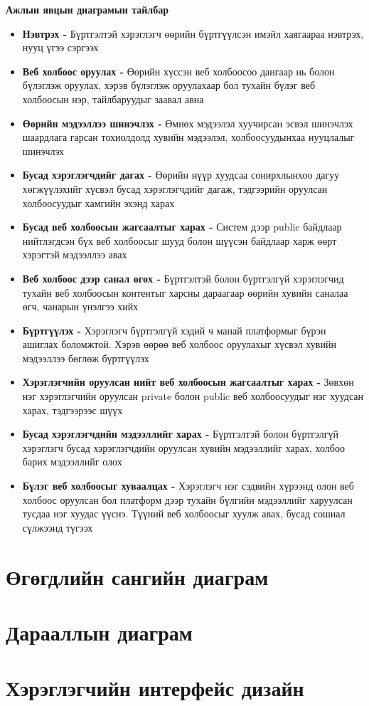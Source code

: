 \pagebreak
\textbf{Ажлын явцын диаграмын тайлбар}

\begin{itemize}
	\item \textbf{Нэвтрэх -} Бүртгэлтэй хэрэглэгч өөрийн бүртгүүлсэн имэйл хаягаараа нэвтрэх, нууц үгээ сэргээх
	\item \textbf{Веб холбоос оруулах -} Өөрийн хүссэн веб холбоосоо дангаар нь болон бүлэглэж оруулах, хэрэв бүлэглэж оруулахаар бол тухайн бүлэг веб холбоосын нэр, тайлбаруудыг заавал авна
	\item \textbf{Өөрийн мэдээллээ шинэчлэх -} Өмнөх мэдээлэл хуучирсан эсвэл шинэчлэх шаардлага гарсан тохиолдолд хувийн мэдээлэл, холбоосуудынхаа нууцлалыг шинэчлэх
	\item \textbf{Бусад хэрэглэгчдийг дагах -} Өөрийн нүүр хуудсаа сонирхлынхоо дагуу хөгжүүлэхийг хүсвэл бусад хэрэглэгчдийг дагаж, тэдгээрийн оруулсан холбоосуудыг хамгийн эхэнд харах
	\item \textbf{Бусад веб холбоосын жагсаалтыг харах -} Систем дээр public байдлаар нийтлэгдсэн бүх веб холбоосыг шууд болон шүүсэн байдлаар харж өөрт хэрэгтэй мэдээллээ авах
	\item \textbf{Веб холбоос дээр санал өгөх -} Бүртгэлтэй болон бүртгэлгүй хэрэглэгчид тухайн веб холбоосын контентыг харсны дараагаар өөрийн хувийн саналаа өгч, чанарын үнэлгээ хийх 
	\item \textbf{Бүртгүүлэх -} Хэрэглэгч бүртгэлгүй хэдий ч манай платформыг бүрэн ашиглах боломжтой. Хэрэв өөрөө веб холбоос оруулахыг хүсвэл хувийн мэдээллээ бөглөж бүртгүүлэх
	\item \textbf{Хэрэглэгчийн оруулсан нийт веб холбоосын жагсаалтыг харах -} Зөвхөн нэг хэрэглэгчийн оруулсан private болон public веб холбоосуудыг нэг хуудсан харах, тэдгээрээс шүүх
	\item \textbf{Бусад хэрэглэгчдийн мэдээллийг харах -} Бүртгэлтэй болон бүртгэлгүй хэрэглэгч бусад хэрэглэгчдийн оруулсан хувийн мэдээллийг харах, холбоо барих мэдээллийг олох
	\item \textbf{Бүлэг веб холбоосыг хуваалцах -} Хэрэглэгч нэг сэдвийн хүрээнд олон веб холбоос оруулсан бол платформ дээр тухайн бүлгийн мэдээллийг харуулсан тусдаа нэг хуудас үүснэ. Түүний веб холбоосыг хуулж авах, бусад сошиал сүлжээнд түгээх
\end{itemize}

\section{Өгөгдлийн сангийн диаграм}
\section{Дарааллын диаграм}
\section{Хэрэглэгчийн интерфейс дизайн}

